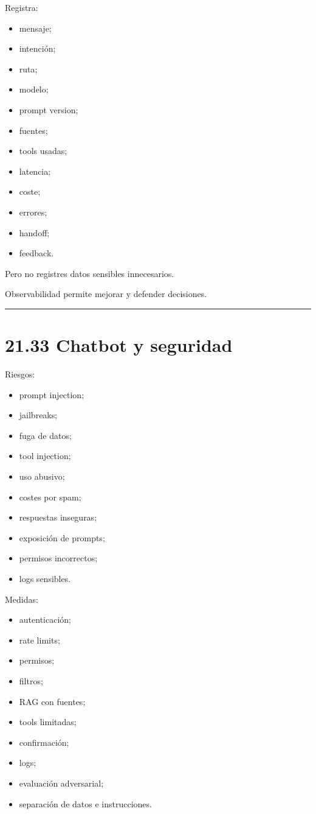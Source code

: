 Registra:

\begin{itemize}
\tightlist
\item
  mensaje;
\item
  intención;
\item
  ruta;
\item
  modelo;
\item
  prompt version;
\item
  fuentes;
\item
  tools usadas;
\item
  latencia;
\item
  coste;
\item
  errores;
\item
  handoff;
\item
  feedback.
\end{itemize}

Pero no registres datos sensibles innecesarios.

Observabilidad permite mejorar y defender decisiones.

\begin{center}\rule{0.5\linewidth}{0.5pt}\end{center}

\section{21.33 Chatbot y seguridad}\label{chatbot-y-seguridad}

Riesgos:

\begin{itemize}
\tightlist
\item
  prompt injection;
\item
  jailbreaks;
\item
  fuga de datos;
\item
  tool injection;
\item
  uso abusivo;
\item
  costes por spam;
\item
  respuestas inseguras;
\item
  exposición de prompts;
\item
  permisos incorrectos;
\item
  logs sensibles.
\end{itemize}

Medidas:

\begin{itemize}
\tightlist
\item
  autenticación;
\item
  rate limits;
\item
  permisos;
\item
  filtros;
\item
  RAG con fuentes;
\item
  tools limitadas;
\item
  confirmación;
\item
  logs;
\item
  evaluación adversarial;
\item
  separación de datos e instrucciones.
\end{itemize}

